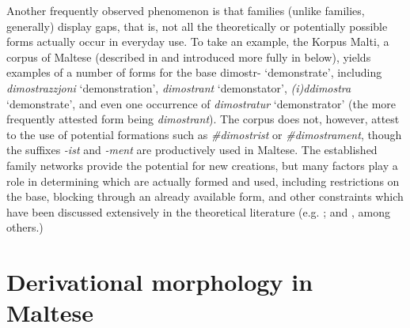 \documentclass[output=paper]{LSP/langsci}
\begin{document}
Another frequently observed phenomenon is that  families (unlike  families, generally) display gaps, that is, not all the theoretically or potentially possible forms actually occur in everyday use. To take an example, the Korpus Malti, a corpus of Maltese (described in \citealt{GattCeplo2013} and introduced more fully in  below), yields examples of a number of forms for the base {\sc dimostr-} `demonstrate', including \textit{dimostrazzjoni} `demonstration', \textit{dimostrant} `demonstator', \textit{(i)ddimostra} `demonstrate', and even one occurrence of \textit{dimostratur} `demonstrator' (the more frequently attested form being \textit{dimostrant}). The corpus does not, however, attest to the use of potential formations such as \textit{\#dimostrist} or \textit{\#dimostrament}, though the suffixes \textit{-ist} and \textit{-ment} are productively used in Maltese. The established family networks provide the potential for new creations, but many factors play a role in determining which are actually formed and used, including  restrictions on the base, blocking through an already available form, and other constraints which have been discussed extensively in the theoretical literature (e.g. \citealt{Spencer1991,SpencerZwicky1998,AronoffFudeman2011}; and \citealt{Haspelmath2010}, among others.)


\section{Derivational morphology in Maltese}\label{sec:derivation}
\end{document}
